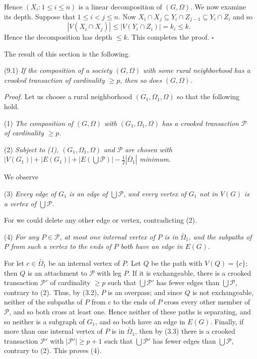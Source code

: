 Hence $(X_i: 1 \le i \le n)$ is a linear decomposition of $(G, \Omega)$. We now examine its depth. Suppose that $1 \le i < j \le n$. Now $X_i \cap X_j \subseteq Y_i \cap Z_{j-1} \subseteq Y_i \cap Z_i$ and so
\begin{equation*}
|V(X_i \cap X_j)| \le |V(Y_i \cap Z_i)| = k_i \le k.
\end{equation*}
Hence the decomposition has depth $\le k$. This completes the proof. $\square$


The result of this section is the following.

\stmt
(9.1) \textit{If the composition of a society $(G, \Omega)$ with some rural neighborhood has a crooked transaction of cardinality $\ge p$, then so does $(G, \Omega)$.}

\textit{Proof.} Let us choose a rural neighborhood $(G_1, \Omega_1, \Omega)$ so that the following hold.

\hspace*{12pt}(1) \textit{The composition of $(G, \Omega)$ with $(G_1, \Omega_1, \Omega)$ has a crooked transaction $\mathscr{P}$ of cardinality $\ge p$.}

\hspace*{12pt}(2) \textit{Subject to (1), $(G_1, \Omega_1, \Omega)$ and $\mathscr{P}$ are chosen with $|V(G_1)| + |E(G_1)| + |E(\bigcup \mathscr{P})| - \frac{1}{2}|\bar{\Omega}_1|$ minimum.}

We observe

\hspace*{12pt}(3) \textit{Every edge of $G_1$ is an edge of $\bigcup \mathscr{P}$, and every vertex of $G_1$ not in $V(G)$ is a vertex of $\bigcup \mathscr{P}$.}

For we could delete any other edge or vertex, contradicting (2).

\hspace*{12pt}(4) \textit{For any $P \in \mathscr{P}$, at most one internal vertex of $P$ is in $\bar{\Omega}_1$, and the subpaths of $P$ from such a vertex to the ends of $P$ both have an edge in $E(G)$.}

For let $c \in \bar{\Omega}_1$ be an internal vertex of $P$. Let $Q$ be the path with $V(Q) = \{c\}$; then $Q$ is an attachment to $\mathscr{P}$ with leg $P$. If it is exchangeable, there is a crooked transaction $\mathscr{P}'$ of cardinality $\ge p$ such that $\bigcup \mathscr{P}'$ has fewer edges than $\bigcup \mathscr{P}$, contrary to (2). Thus, by (3.2), $P$ is an overpass; and since $Q$ is not exchangeable, neither of the subpaths of $P$ from $c$ to the ends of $P$ cross every other member of $\mathscr{P}$, and so both cross at least one. Hence neither of these paths is separating, and so neither is a subgraph of $G_1$, and so both have an edge in $E(G)$. Finally, if more than one internal vertex of $P$ is in $\bar{\Omega}_1$, then by (3.3) there is a crooked transaction $\mathscr{P}'$ with $|\mathscr{P}'| \ge p+1$ such that $\bigcup \mathscr{P}'$ has fewer edges than $\bigcup \mathscr{P}$, contrary to (2). This proves (4).

